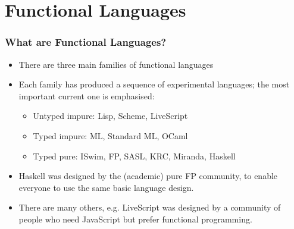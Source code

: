 \documentclass{beamer}
\begin{document}
\section{Functional Languages}
\begin{frame}
\frametitle{What are Functional Languages?}

\begin{itemize}
\item There are three main families of functional languages
\item Each family has produced a sequence of experimental
  languages; the most important current one is emphasised:
  \begin{itemize}
  \item Untyped impure: Lisp, {\bluetext Scheme, LiveScript}
  \item Typed impure: ML, Standard ML, {\bluetext OCaml}
  \item Typed pure: ISwim, FP, SASL, KRC, Miranda, {\bluetext
      Haskell}
  \end{itemize}

\item Haskell was designed by the (academic) pure FP community, to enable everyone to use the same basic language design.
\item There are many others, e.g. LiveScript was designed by a community of people who need JavaScript but prefer functional programming.
\end{itemize}

\end{frame}


%
%
\end{document}
